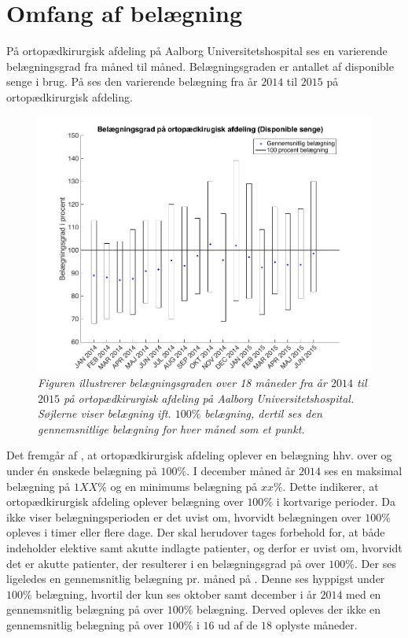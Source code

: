 \section{Omfang af belægning}
På ortopædkirurgisk afdeling på Aalborg Universitetshospital ses en varierende belægningsgrad fra måned til måned. Belægningsgraden er antallet af disponible senge i brug. På  ses den varierende belægning fra år $2014$ til $2015$ på ortopædkirurgisk afdeling. \cite{SDS2015}


\begin{figure}[H]
	\flushleft 
	\centering
	\includegraphics[scale=.45]{figures/maxminoverbelaeg.png}

	\flushleft
	\caption{\textit{Figuren illustrerer belægningsgraden over 18 måneder fra år $2014$ til $2015$ på ortopædkirurgisk afdeling på Aalborg Universitetshospital. Søjlerne viser belægning ift. $100\%$ belægning, dertil ses den gennemsnitlige belægning for hver måned som et punkt. \cite{SDS2015}}}
	\label{maxminbelaeg}
\end{figure}


Det fremgår af , at ortopædkirurgisk afdeling oplever en belægning hhv. over og under én ønskede belægning på $100 \%$. I december måned år $2014$ ses en maksimal belægning på $1XX \%$ og en minimums belægning på $xx \%$. Dette indikerer, at ortopædkirurgisk afdeling oplever belægning over $100 \%$ i kortvarige perioder. Da  ikke viser belægningsperioden er det uvist om, hvorvidt belægningen over $100 \%$ opleves i timer eller flere dage. Der skal herudover tages forbehold for, at  både indeholder elektive samt akutte indlagte patienter, og derfor er uvist om, hvorvidt det er akutte patienter, der resulterer i en belægningsgrad på over $100 \%$. Der ses ligeledes en gennemsnitlig belægning pr. måned på . Denne ses hyppigst under $100 \%$ belægning, hvortil der kun ses oktober samt december i år $2014$ med en gennemsnitlig belægning på over $100 \%$ belægning. Derved opleves der ikke en gennemsnitlig belægning på over $100 \%$ i $16$ ud af de $18$ oplyste måneder. \cite{SDS2015}


